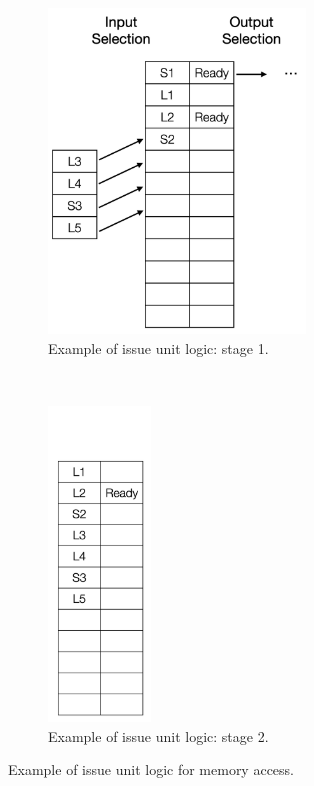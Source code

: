 \begin{figure}[!htp]
    \centering
    \begin{subfigure}{0.4\textwidth}
        \centering
        \includegraphics[width=0.75\textwidth]{figure/iq2.png}
        \caption{Example of issue unit logic: stage 1.}
        \label{fig:iq-mem-1}
    \end{subfigure}
    ~
    \begin{subfigure}{0.4\textwidth}
        \centering
        \includegraphics[width=0.3\textwidth]{figure/iq3.png}
        \caption{Example of issue unit logic: stage 2.}
        \label{fig:iq-mem-2}
    \end{subfigure}
    \caption{Example of issue unit logic for memory access.}
    \label{fig:iq-mem}
\end{figure}


